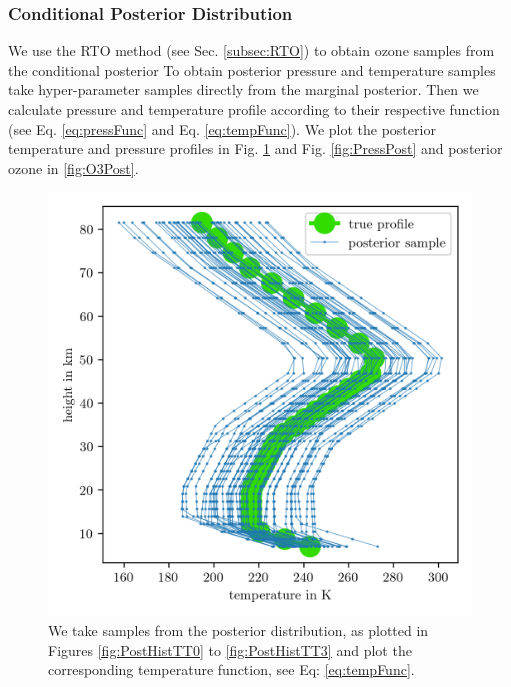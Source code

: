 \subsubsection{Conditional Posterior Distribution}
We use the RTO method (see Sec. \ref{subsec:RTO}) to obtain ozone samples from the conditional posterior
To obtain posterior pressure and temperature samples take hyper-parameter samples directly from the marginal posterior.
Then we calculate pressure and temperature profile according to their respective function (see Eq. \ref{eq:pressFunc} and Eq. \ref{eq:tempFunc}). 
We plot the posterior temperature and pressure profiles in Fig. \ref{fig:TempPost} and Fig. \ref{fig:PressPost} and posterior ozone in \ref{fig:O3Post}.
\begin{figure}[ht!]
	\centering
	\includegraphics{TempPostMeanSigm.png} 
	\caption[Temperature posterior samples.]{We take samples from the posterior distribution, as plotted in Figures \ref{fig:PostHistTT0} to \ref{fig:PostHistTT3} and plot the corresponding temperature function, see Eq: \ref{eq:tempFunc}. }
	\label{fig:TempPost}
\end{figure}
\cleardoublepage
